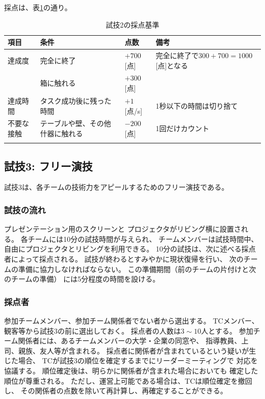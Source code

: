 \documentclass[a4j]{jarticle}
\def\thline{\noalign{\hrule height 1pt}}
\begin{document}
採点は、表\ref{table:test2score}の通り。

\begin{table}
\begin{center}
\caption{試技2の採点基準}
\label{table:test2score}
\begin{tabular}{l|p{5cm}|l|p{5cm}}
\thline
項目 & 条件 & 点数 & 備考\\
\hline
達成度 & 完全に終了 & $+700$[点] & 完全に終了で$300 + 700 = 1000$[点]となる \\
& 箱に触れる & $+300$[点] & \\
\hline
達成時間 & タスク成功後に残った時間 & $+1$[点/s] & 1秒以下の時間は切り捨て\\
\hline
不要な接触 & テーブルや壁、その他什器に触れる & $-200$[点] & 1回だけカウント\\
\thline
\end{tabular}
\end{center}
\end{table}


\subsection{試技3: フリー演技}

試技3は、各チームの技術力をアピールするためのフリー演技である。

\subsubsection{試技の流れ}

プレゼンテーション用のスクリーンと
プロジェクタがリビング横に設置される。
各チームには10分の試技時間が与えられ、
チームメンバーは試技時間中、
自由にプロジェクタとリビングを利用できる。
10分の試技は、次に述べる採点者によって採点される。
試技が終わるとすみやかに現状復帰を行い、
次のチームの準備に協力しなければならない。
この準備期間（前のチームの片付けと次のチームの準備）
には5分程度の時間を設ける。

\subsubsection{採点者}

参加チームメンバー、参加チーム関係者でない者から選出する。
TCメンバー、観客等から試技3の前に選出しておく。
採点者の人数は$3\sim10$人とする。
参加チーム関係者には、あるチームメンバーの大学・企業の同窓や、
指導教員、上司、親族、友人等が含まれる。
採点者に関係者が含まれているという疑いが生じた場合、
TCが試技3の順位を確定するまでにリーダーミーティングで
対応を協議する。
順位確定後は、明らかに関係者が含まれた場合においても
確定した順位が尊重される。
ただし、運営上可能である場合は、TCは順位確定を撤回し、
その関係者の点数を除いて再計算し、再確定することができる。
\end{document}
